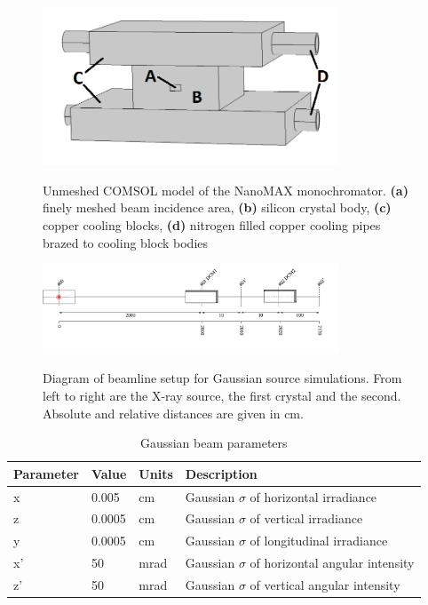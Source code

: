 \documentclass[preprint]{iucr}              %
\begin{document}
\begin{figure}
\caption{Unmeshed COMSOL model of the NanoMAX monochromator. \textbf{(a)} finely meshed beam incidence area, \textbf{(b)} silicon crystal body, \textbf{(c)} copper cooling blocks, \textbf{(d)} nitrogen filled copper cooling pipes brazed to cooling block bodies}
\includegraphics[width = 8.85cm]{images/nanomaxcomsol.png}
\label{fig:nanomaxcomsol}
\end{figure}


\begin{figure}
\caption{Diagram of beamline setup for Gaussian source simulations. From left to right are the X-ray source, the first crystal and the second. Absolute and relative distances are given in cm.}
\includegraphics[width = 8.85cm]{images/gaussian_beamline.png}
\label{fig:dcmtracing}
\end{figure}



\begin{table}\label{gaussian_table}
\caption{Gaussian beam parameters}
\begin{tabular}{@{}llll@{}}
Parameter       & Value         & Units     & Description                                           \\
\hline
x               & 0.005         & cm        & Gaussian $\sigma$ of horizontal irradiance            \\
z               & 0.0005        & cm        & Gaussian $\sigma$ of vertical irradiance              \\ 
y               & 0.0005        & cm        & Gaussian $\sigma$ of longitudinal irradiance          \\
x'              & 50            & mrad      & Gaussian $\sigma$ of horizontal angular intensity     \\
z'              & 50            & mrad      & Gaussian $\sigma$ of vertical angular intensity       \\

\end{tabular}
\end{table}
\end{document}
